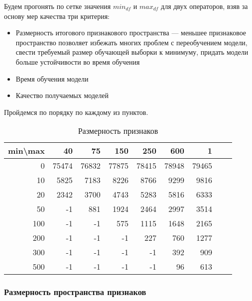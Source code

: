 \documentclass{article}
\begin{document}
        Будем прогонять по сетке значения ${min}_{df}$ и ${max}_{df}$ для двух операторов, взяв за основу мер качества три критерия:
        \begin{itemize}
            \item Размерность итогового признакового пространства — меньшее признаковое пространство позволяет избежать многих проблем с переобучением модели, свести требуемый размер обучающей выборки к минимуму, придать модели больше устойчивости во время обучения
            \item Время обучения модели
            \item Качество получаемых моделей
        \end{itemize}

        Пройдемся по порядку по каждому из пунктов.

\begin{wraptable}[11]{l}{10cm}
    \caption{Размерность признаков }
    \label{tab:domain_sizes}
    \begin{tabular}{|r|r|r|r|r|r|r|r|r|}
    \hline
    
min\textbackslash{}max &    40 &    75 &   150 &   250 &   600 &   1 \\
\hline
             0 & 75474 & 76832 & 77875 & 78415 & 78948 & 79465 \\
\hline
            10 &  5825 &  7183 &  8226 &  8766 &  9299 &  9816 \\
\hline
            20 &  2342 &  3700 &  4743 &  5283 &  5816 &  6333 \\
\hline
            50 &  -1   &    881 &   1924 &  2464 &  2997 &  3514 \\
\hline
           100 &  -1   &    -1 &    575 &   1115 &  1648 &  2165 \\
\hline
           200 &  -1   &    -1 &    -1 &    227 &   760 &   1277 \\
\hline
           300 &   -1  &    -1 &    -1 &    -1 &    392 &   909 \\
\hline
           500 &   -1 &     -1 &    -1 &    -1 &    96 &    613 \\
\hline 
    \end{tabular}
\end{wraptable}


        \subsubsection{Размерность пространства признаков}
\end{document}
